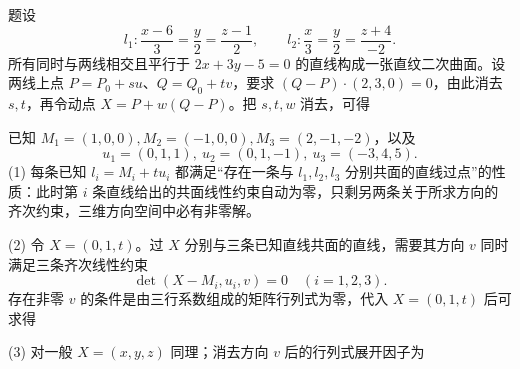 题设
\[l_1:\frac{x-6}{3}=\frac{y}{2}=\frac{z-1}{2},\qquad
 l_2:\frac{x}{3}=\frac{y}{2}=\frac{z+4}{-2}.\]
所有同时与两线相交且平行于 $2x+3y-5=0$ 的直线构成一张直纹二次曲面。设两线上点 $P=P_0+su$、$Q=Q_0+tv$，要求 $(Q-P)\cdot(2,3,0)=0$，由此消去 $s,t$，再令动点 $X=P+w(Q-P)$。把 $s,t,w$ 消去，可得

已知 $M_1=(1,0,0),M_2=(-1,0,0),M_3=(2,-1,-2)$，以及
\[u_1=(0,1,1),\ u_2=(0,1,-1),\ u_3=(-3,4,5).\]
(1) 每条已知 $l_i=M_i+t u_i$ 都满足“存在一条与 $l_1,l_2,l_3$ 分别共面的直线过点”的性质：此时第 $i$ 条直线给出的共面线性约束自动为零，只剩另两条关于所求方向的齐次约束，三维方向空间中必有非零解。

(2) 令 $X=(0,1,t)$。过 $X$ 分别与三条已知直线共面的直线，需要其方向 $v$ 同时满足三条齐次线性约束
\[
\det(X-M_i,u_i,v)=0\quad(i=1,2,3).
\]
存在非零 $v$ 的条件是由三行系数组成的矩阵行列式为零，代入 $X=(0,1,t)$ 后可求得

(3) 对一般 $X=(x,y,z)$ 同理；消去方向 $v$ 后的行列式展开因子为
